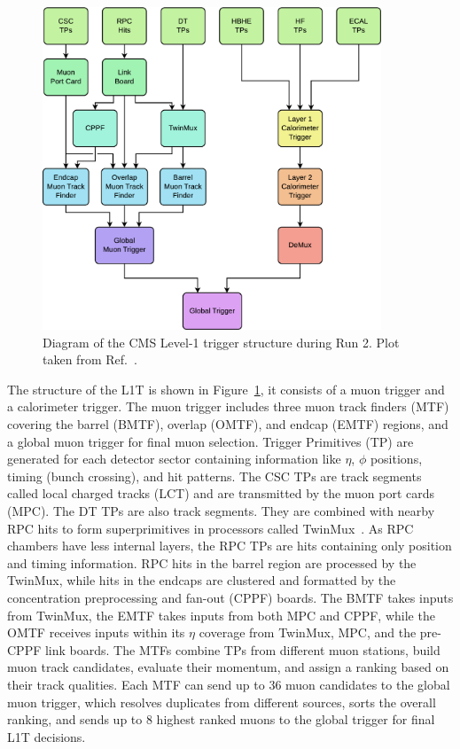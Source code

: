 \begin{figure}[!htb]
    \centering
    \captionsetup{justification=justified}
    \includegraphics[width=0.90\textwidth]{pics/LHC_CMS/L1T.png}
    \caption{Diagram of the CMS Level-1 trigger structure during Run 2.
             Plot taken from Ref.~\cite{l1t_perform}.}
    \label{fig:cms_l1t}
\end{figure}

The structure of the L1T is shown in Figure~\ref{fig:cms_l1t}, 
it consists of a muon trigger and a calorimeter trigger.
The muon trigger includes three muon track finders (MTF) covering the barrel (BMTF), overlap (OMTF), and endcap (EMTF) regions,
and a global muon trigger for final muon selection. 
Trigger Primitives (TP) are generated for each detector sector containing information like $\eta$, $\phi$ positions, timing (bunch crossing), and hit patterns.
The CSC TPs are track segments called local charged tracks (LCT) and are transmitted by the muon port cards (MPC).
The DT TPs are also track segments. 
They are combined with nearby RPC hits to form superprimitives in processors called TwinMux~\cite{CMS-DP-2016-074}.
As RPC chambers have less internal layers, the RPC TPs are hits containing only position and timing information.
RPC hits in the barrel region are processed by the TwinMux, while hits in the endcaps are clustered and formatted by the concentration preprocessing and fan-out (CPPF) boards.
The BMTF takes inputs from TwinMux, the EMTF takes inputs from both MPC and CPPF, 
while the OMTF receives inputs within its $\eta$ coverage from TwinMux, MPC, and the pre-CPPF link boards.
The MTFs combine TPs from different muon stations, build muon track candidates, 
evaluate their momentum, and assign a ranking based on their track qualities.
Each MTF can send up to 36 muon candidates to the global muon trigger, 
which resolves duplicates from different sources, sorts the overall ranking, 
and sends up to 8 highest ranked muons to the global trigger for final L1T decisions.

